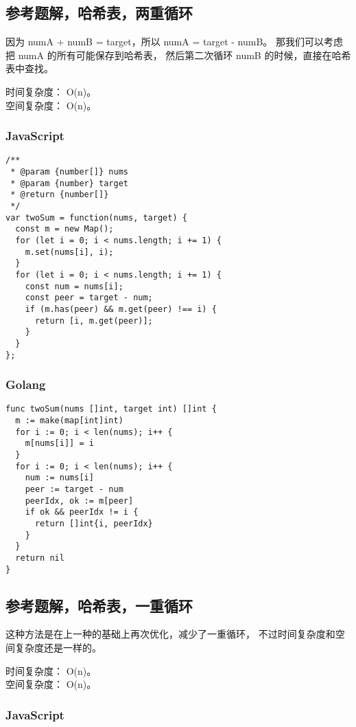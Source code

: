 \subsection{参考题解，哈希表，两重循环}

因为 numA + numB = target，所以 numA = target - numB。
那我们可以考虑把 numA 的所有可能保存到哈希表，
然后第二次循环 numB 的时候，直接在哈希表中查找。

时间复杂度： O(n)。\\
空间复杂度： O(n)。

\subsubsection{JavaScript}

\begin{verbatim}
/**
 * @param {number[]} nums
 * @param {number} target
 * @return {number[]}
 */
var twoSum = function(nums, target) {
  const m = new Map();
  for (let i = 0; i < nums.length; i += 1) {
    m.set(nums[i], i);
  }
  for (let i = 0; i < nums.length; i += 1) {
    const num = nums[i];
    const peer = target - num;
    if (m.has(peer) && m.get(peer) !== i) {
      return [i, m.get(peer)];
    }
  }
};
\end{verbatim}

\subsubsection{Golang}

\begin{verbatim}
func twoSum(nums []int, target int) []int {
  m := make(map[int]int)
  for i := 0; i < len(nums); i++ {
    m[nums[i]] = i
  }
  for i := 0; i < len(nums); i++ {
    num := nums[i]
    peer := target - num
    peerIdx, ok := m[peer]
    if ok && peerIdx != i {
      return []int{i, peerIdx}
    }
  }
  return nil
}
\end{verbatim}

\subsection{参考题解，哈希表，一重循环}

这种方法是在上一种的基础上再次优化，减少了一重循环，
不过时间复杂度和空间复杂度还是一样的。

时间复杂度： O(n)。\\
空间复杂度： O(n)。

\subsubsection{JavaScript}

